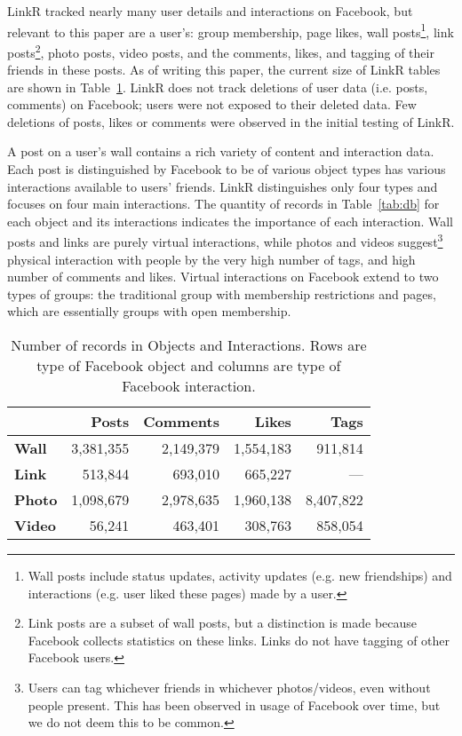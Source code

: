 \documentclass[letterpaper]{article}
\begin{document}
LinkR tracked nearly many user details and interactions on Facebook, but relevant to this paper are a user's: group membership, page likes, wall posts\footnote{Wall posts include status updates, activity updates (e.g. new friendships) and interactions (e.g. user liked these pages) made by a user.}, link posts\footnote{Link posts are a subset of wall posts, but a distinction is made because Facebook collects statistics on these links. Links do not have tagging of other Facebook users.}, photo posts, video posts, and the comments, likes, and tagging of their friends in these posts. As of writing this paper, the current size of LinkR tables are shown in Table~\ref{tab:interactions}. LinkR does not track deletions of user data (i.e. posts, comments) on Facebook; users were not exposed to their deleted data. Few deletions of posts, likes or comments were observed in the initial testing of LinkR.


A post on a user's wall contains a rich variety of content and interaction data. Each post is distinguished by Facebook to be of various object types has various interactions available to users' friends. LinkR distinguishes only four types and focuses on four main interactions. The quantity of records in Table~\ref{tab:db} for each object and its interactions indicates the importance of each interaction. Wall posts and links are purely virtual interactions, while photos and videos suggest\footnote{Users can tag whichever friends in whichever photos/videos, even without people present. This has been observed in usage of Facebook over time, but we do not deem this to be common.} physical interaction with people by the very high number of tags, and high number of comments and likes. Virtual interactions on Facebook extend to two types of groups: the traditional group with membership restrictions and pages, which are essentially groups with open membership.




\begin{table}
\centering
\caption{\small Number of records in Objects and Interactions. Rows are type of Facebook object and columns are type of Facebook interaction.}
\label{tab:interactions}
\begin{tabular}{|>{\small}l|>{\small}r|>{\small}r|>{\small}r|>{\small}r|}
\hline
 & \textbf{Posts} & \textbf{Comments} & \textbf{Likes} & \textbf{Tags} \\
\hline
\textbf{Wall} & 3,381,355 & 2,149,379 & 1,554,183 & 911,814 \\
\hline
\textbf{Link} & 513,844 & 693,010 & 665,227 & --- \\
\hline
\textbf{Photo} & 1,098,679 & 2,978,635 & 1,960,138 & 8,407,822 \\
\hline
\textbf{Video} & 56,241 & 463,401 & 308,763 & 858,054 \\
\hline
\end{tabular}
\end{table}
\end{document}
